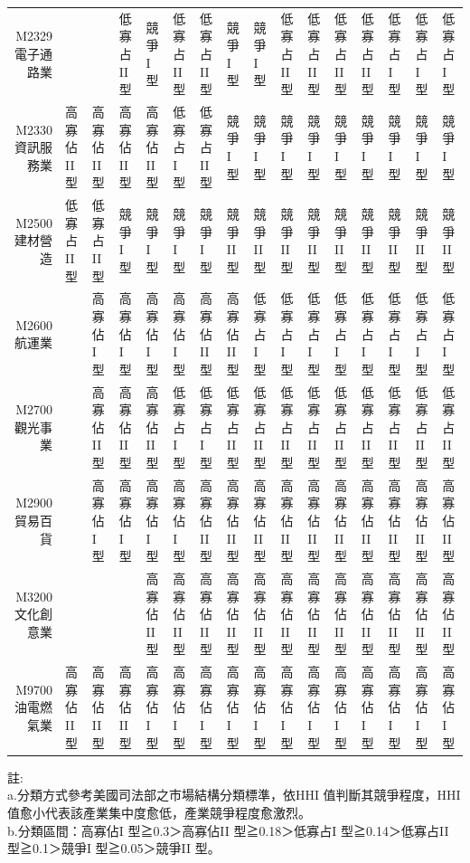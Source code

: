 \documentclass[a4paper]{article}\usepackage[]{graphicx}\usepackage[]{color}
\begin{document}
\begin{landscape}
\begin{table}[ht]
{\begin{tabular}{rlllllllllllllll}
  M2329電子通路業 &  &  & 低寡占II 型 & 競爭I 型 & 低寡占II 型 & 低寡占II 型 & 競爭I 型 & 競爭I 型 & 低寡占II 型 & 低寡占II 型 & 低寡占II 型 & 低寡占II 型 & 低寡占I 型 & 低寡占I 型 & 低寡占I 型 \\ 
  M2330資訊服務業 & 高寡佔II 型 & 高寡佔II 型 & 高寡佔II 型 & 高寡佔II 型 & 低寡占I 型 & 低寡占II 型 & 競爭I 型 & 競爭I 型 & 競爭I 型 & 競爭I 型 & 競爭I 型 & 競爭I 型 & 競爭I 型 & 競爭I 型 & 競爭I 型 \\ 
  M2500建材營造 & 低寡占II 型 & 低寡占II 型 & 競爭I 型 & 競爭I 型 & 競爭I 型 & 競爭I 型 & 競爭II 型 & 競爭II 型 & 競爭II 型 & 競爭II 型 & 競爭II 型 & 競爭II 型 & 競爭II 型 & 競爭II 型 & 競爭II 型 \\ 
  M2600航運業 &  & 高寡佔I 型 & 高寡佔I 型 & 高寡佔I 型 & 高寡佔I 型 & 高寡佔II 型 & 高寡佔II 型 & 低寡占I 型 & 低寡占I 型 & 低寡占I 型 & 低寡占I 型 & 低寡占I 型 & 低寡占I 型 & 低寡占I 型 & 低寡占I 型 \\ 
  M2700觀光事業 &  & 高寡佔II 型 & 高寡佔II 型 & 高寡佔II 型 & 低寡占I 型 & 低寡占I 型 & 低寡占II 型 & 低寡占II 型 & 低寡占II 型 & 低寡占II 型 & 低寡占II 型 & 低寡占II 型 & 低寡占II 型 & 低寡占II 型 & 低寡占II 型 \\ 
  M2900貿易百貨 &  & 高寡佔I 型 & 高寡佔I 型 & 高寡佔I 型 & 高寡佔I 型 & 高寡佔II 型 & 高寡佔II 型 & 高寡佔II 型 & 高寡佔II 型 & 高寡佔II 型 & 高寡佔II 型 & 高寡佔II 型 & 高寡佔II 型 & 高寡佔II 型 & 高寡佔II 型 \\ 
  M3200文化創意業 &  &  &  & 高寡佔II 型 & 高寡佔II 型 & 高寡佔II 型 & 高寡佔II 型 & 高寡佔II 型 & 高寡佔II 型 & 高寡佔II 型 & 高寡佔II 型 & 高寡佔II 型 & 高寡佔II 型 & 高寡佔II 型 & 高寡佔II 型 \\ 
  M9700油電燃氣業 & 高寡佔II 型 & 高寡佔II 型 & 高寡佔II 型 & 高寡佔I 型 & 高寡佔I 型 & 高寡佔I 型 & 高寡佔I 型 & 高寡佔I 型 & 高寡佔I 型 & 高寡佔I 型 & 高寡佔I 型 & 高寡佔I 型 & 高寡佔I 型 & 高寡佔I 型 & 高寡佔I 型 \\ 
   \hline
\end{tabular}
}
\end{table}

註:\\
a.分類方式參考美國司法部之市場結構分類標準，依HHI 值判斷其競爭程度，HHI 值愈小代表該產業集中度愈低，產業競爭程度愈激烈。\\
b.分類區間：高寡佔I 型≧0.3＞高寡佔II 型≧0.18＞低寡占I 型≧0.14＞低寡占II 型≧0.1＞競爭I 型≧0.05＞競爭II 型。\\
\end{landscape}
\restoregeometry
\end{document}
